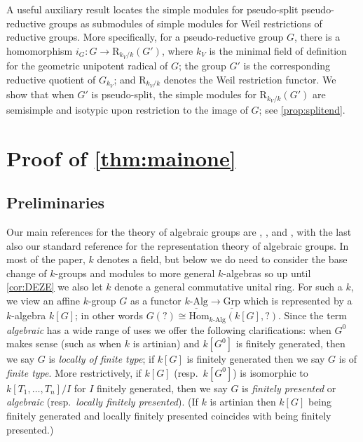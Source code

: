 \documentclass[11pt,reqno]{amsart}
\theoremstyle{definition}
\theoremstyle{remark}
\theoremstyle{definition}
\theoremstyle{plain}
\newcommand{\R}{\mathrm{R}}
\newcommand{\Hom}{\mathrm{Hom}}
\begin{document}
A useful auxiliary result locates the simple modules for pseudo-split pseudo-reductive groups as submodules of simple modules for Weil restrictions of reductive groups. More specifically, for a pseudo-reductive group $G$, there is a homomorphism $i_G:G\to \R_{k_V/k}(G')$, where $k_V$ is the minimal field of definition for the geometric unipotent radical of $G$; the group $G'$ is the corresponding reductive quotient of $G_{k_V}$; and $\R_{k_V/k}$ denotes the Weil restriction functor. We show that when $G'$ is pseudo-split, the simple modules for $\R_{k_V/k}(G')$ are semisimple and isotypic upon restriction to the image of $G$; see \cref{prop:splitend}.

\section[{Proof of \texorpdfstring{\cref{thm:mainone}}{Theorem 1}}]{Proof of \texorpdfstring{\cref{thm:mainone}}{Theorem 1}}\label{parti}
\subsection{Preliminaries}\label{sec:prelims}


Our main references for the theory of algebraic groups are \cite{CGP15}, \cite{Milne17}, and \cite{Jan03}, with the last also our standard reference for
the representation theory of algebraic groups. 
In most of the paper, $k$ denotes a field, but below we do need to consider the base change of $k$-groups and modules to
more general $k$-algebras so up until \cref{cor:DEZE} we also let $k$ denote a general commutative unital ring. 
For such a $k$, we view an affine $k$-group $G$ as a functor $\underline{k\textrm{-Alg}}\to \underline{\mathrm{Grp}}$
which is represented by a $k$-algebra $k[G]$; in other words $G(?)\cong \Hom_{k\textrm{-Alg}}(k[G],?)$. Since the term \emph{algebraic} has a wide range of uses we offer the following clarifications: when $G^0$ makes sense (such as when $k$ is artinian) and $k[G^0]$ is finitely generated, then we say $G$ is \emph{locally of finite type}; if $k[G]$ is finitely generated then we say $G$ is of \emph{finite type}. More restrictively, if $k[G]$ (resp.~$k[G^0]$) is isomorphic to $k[T_1,\dots,T_n]/I$ for $I$ finitely generated, then we say $G$ is \emph{finitely presented} or \emph{algebraic} (resp.~\emph{locally finitely presented}). (If $k$ is artinian then $k[G]$ being finitely generated and locally finitely presented coincides with being finitely presented.)
\end{document}
